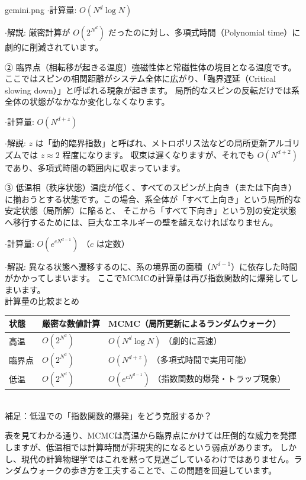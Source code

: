 \documentclass[a4paper,10.5pt]{jlreq}
\begin{document}
\begin{chatbox}{gemini.png}
$\cdot$計算量: $O(N^d \log N)$

$\cdot$解説: 厳密計算が $O(2^{N^d})$ だったのに対し、多項式時間（Polynomial time）に劇的に削減されています。

② 臨界点（相転移が起きる温度）強磁性体と常磁性体の境目となる温度です。ここではスピンの相関距離がシステム全体に広がり、「臨界遅延（Critical slowing down）」と呼ばれる現象が起きます。
局所的なスピンの反転だけでは系全体の状態がなかなか変化しなくなります。

$\cdot$計算量: $O(N^{d+z})$

$\cdot$解説: $z$ は「動的臨界指数」と呼ばれ、メトロポリス法などの局所更新アルゴリズムでは $z \approx 2$ 程度になります。
収束は遅くなりますが、それでも $O(N^{d+2})$ であり、多項式時間の範囲内に収まっています。

③ 低温相（秩序状態）温度が低く、すべてのスピンが上向き（または下向き）に揃おうとする状態です。この場合、系全体が「すべて上向き」という局所的な安定状態（局所解）に陥ると、
そこから「すべて下向き」という別の安定状態へ移行するためには、巨大なエネルギーの壁を越えなければなりません。

$\cdot$計算量: $O(e^{c N^{d-1}})$ （$c$ は定数）

$\cdot$解説: 異なる状態へ遷移するのに、系の境界面の面積（$N^{d-1}$）に依存した時間がかかってしまいます。
ここでMCMCの計算量は再び指数関数的に爆発してしまいます。\\

計算量の比較まとめ

\begin{tabular}{lll}
   状態 & 厳密な数値計算 & MCMC（局所更新によるランダムウォーク） \\ \hline
   高温 & $O(2^{N^d})$ & $O(N^d \log N)$ （劇的に高速） \\ \hline
   臨界点 & $O(2^{N^d})$ & $O(N^{d+z})$ （多項式時間で実用可能） \\ \hline
   低温 & $O(2^{N^d})$ & $O(e^{c N^{d-1}})$ （指数関数的爆発・トラップ現象）\\
\end{tabular}\\
 

補足：低温での「指数関数的爆発」をどう克服するか？

表を見てわかる通り、MCMCは高温から臨界点にかけては圧倒的な威力を発揮しますが、低温相では計算時間が非現実的になるという弱点があります。
しかし、現代の計算物理学ではこれを黙って見過ごしているわけではありません。ランダムウォークの歩き方を工夫することで、この問題を回避しています。\\


\end{chatbox}
\end{document}
